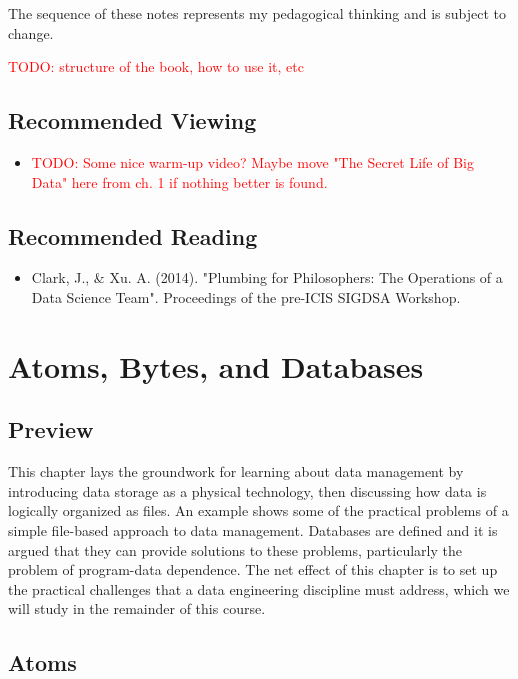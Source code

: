 \documentclass[11pt]{book}
\newcommand{\todo}[1]{\textcolor{red}{TODO: #1}} %
\begin{document}
The sequence of these notes represents my pedagogical thinking and is subject to change.

\todo{structure of the book, how to use it, etc}

\section*{Recommended Viewing}
\begin{itemize}
    \item \todo{Some nice warm-up video? Maybe move "The Secret Life of Big Data" here from ch. 1 if nothing better is found.}
\end{itemize}

\section*{Recommended Reading}
\begin{itemize}
    \item Clark, J., \& Xu. A. (2014). "Plumbing for Philosophers: The Operations of a Data Science Team".  Proceedings of the pre-ICIS SIGDSA Workshop.
\end{itemize}

\mainmatter %



\chapter{Atoms, Bytes, and Databases}

\section*{Preview}

This chapter lays the groundwork for learning about data management by introducing data storage as a physical technology, then discussing how data is logically organized as files.  An example shows some of the practical problems of a simple file-based approach to data management.  Databases are defined and it is argued that they can provide solutions to these problems, particularly the problem of program-data dependence.  The net effect of this chapter is to set up the practical challenges that a data engineering discipline must address, which we will study in the remainder of this course.


\section{Atoms}
\end{document}
